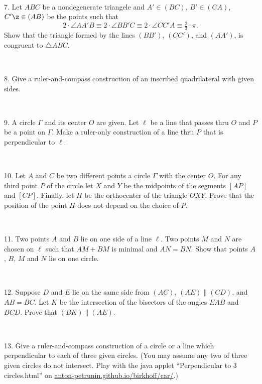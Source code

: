 \documentclass[oneside,a4paper]{article}
\begin{document}
\ 

\noi %
{7.} Let $ABC$ be a nondegenerate triangele and $A'\in (BC)$, $B'\in (CA)$, $C'\z\in (AB)$ be the points such that 
\[2\cdot \angle AA'B\equiv 2\cdot \angle BB'C\equiv 2\cdot \angle CC'A\equiv \tfrac23{\cdot}\pi.\]
Show that the triangle formed by the lines $(BB')$, $(CC')$, and $(AA')$, is congruent to  $\triangle ABC$.

\ 

\noi %
{8.} Give a ruler-and-compass construction of an inscribed quadrilateral with given sides.

\ 

\noi %
{9.} A circle $\Gamma$ and its center $O$ are given.
Let $\ell$ be a line that passes thru $O$ and $P$ be a point on $\Gamma$.
Make a ruler-only construction of a line thru $P$ that is perpendicular to $\ell$.


\ 

\noi %
{10.}
Let $A$ and $C$ be two different points a circle $\Gamma$ with the center $O$. For any third point $P$ of the circle let $X$ and $Y$ be the midpoints of the segments $[AP]$ and $[CP]$. Finally, let $H$ be the orthocenter of the triangle $OXY$.
Prove that the position of the point $H$ does not depend on the choice of $P$.

\ 

\noi %
{11.} Two points $A$ and $B$ lie on one side of a line $\ell$. 
Two points $M$ and $N$ are chosen on $\ell$ such that $AM + BM$ is minimal and $AN = BN$. 
Show that points $A$, $B$, $M$ and $N$ lie on one circle.

\ 

\noi %
{12.}
Suppose $D$ and $E$ lie on the same side from $(AC)$, $(AE)\parallel (CD)$, and $AB=BC$.
Let $K$ be the intersection of the bisectors of the angles $EAB$ and $BCD$.
Prove that $(BK) \parallel (AE)$.

\ 

\noi %
{13.} Give a ruler-and-compass construction of a circle or a line which perpendicular to each of three given circles. 
(You may assume any two of three given circles do not intersect. Play with the java applet ``Perpendicular to 3 circles.html'' on  \href{http://anton-petrunin.github.io/birkhoff/car/}{anton-petrunin.github.io/birkhoff/car/}.)
\end{document}
